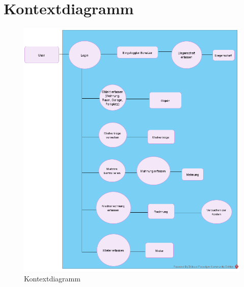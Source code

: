 \section{Kontextdiagramm}
\begin{figure}[H]
    \begin{center}
        \includegraphics[width=0.99\linewidth]{content/diagrams/out/contextdiagram/context.png}
        \caption{Kontextdiagramm}
      \end{center}
  \end{figure}